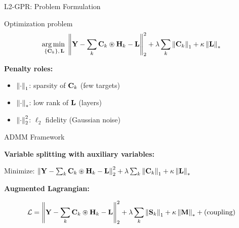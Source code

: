 \begin{frame}{L2-GPR: Problem Formulation}

  \begin{shibuiframe}{Optimization problem}
    \small
    \[
      \underset{\{\mathbf{C}_{k}\},\,\mathbf{L}}{\operatorname*{arg\,min}\;}
        \left\| \mathbf{Y} - \sum_{k} \mathbf{C}_{k} \circledast \mathbf{H}_{k} - \mathbf{L} \right\|_{2}^{2}
        + \lambda \sum_{k} \left\| \mathbf{C}_{k} \right\|_{1}
        + \kappa \left\| \mathbf{L} \right\|_{*}
    \]
  \end{shibuiframe}

  \vspace{0.4em}

  \textbf{Penalty roles:}

  \vspace{0.2em}
  \begin{itemize}
    \setlength{\itemsep}{0.08em}
    \item $\left\| \cdot \right\|_{1}$: sparsity of $\mathbf{C}_{k}$ (few targets)
    \pause
    \item $\left\| \cdot \right\|_{*}$: low rank of $\mathbf{L}$ (layers)
    \pause
    \item $\left\| \cdot \right\|_{2}^{2}$: $\ell_2$ fidelity (Gaussian noise)
  \end{itemize}

  \vspace{0.3em}
\end{frame}

\begin{frame}{ADMM Framework \skipbadge{}}

  \textbf{Variable splitting with auxiliary variables:}
  \vspace{0.15em}
  \begin{shibuiframe}{ }
    \small
    Minimize: $\left\| \mathbf{Y} - \sum_{k}\mathbf{C}_{k}\circledast\mathbf{H}_{k} - \mathbf{L} \right\|_{2}^{2}
    + \lambda\sum_{k}\left\| \mathbf{C}_{k} \right\|_{1} + \kappa\left\| \mathbf{L} \right\|_{*}$
  \end{shibuiframe}

  \vspace{0.3em}
  \textbf{Augmented Lagrangian:}
  \vspace{0.15em}
  \begin{shibuiframe}{ }
    \small
    \[
      \mathcal{L} = \left\| \mathbf{Y} - \sum_{k}\mathbf{C}_{k}\circledast\mathbf{H}_{k} - \mathbf{L} \right\|_{2}^{2}
         + \lambda\sum_{k}\left\| \mathbf{S}_{k} \right\|_{1} + \kappa\left\| \mathbf{M} \right\|_{*} + \text{(coupling)}
    \]
  \end{shibuiframe}

\end{frame}

